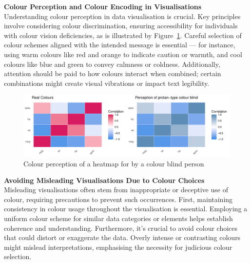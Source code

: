 \documentclass{article}\usepackage[]{graphicx}\usepackage[]{xcolor}
\makeatletter
\def\maxwidth{ %
  \ifdim\Gin@nat@width>\linewidth
    \linewidth
  \else
    \Gin@nat@width
  \fi
}
\newenvironment{knitrout}{}{} %
\numberwithin{equation}{section}
\makeatother
\begin{document}
\noindent \textbf{Colour Perception and Colour Encoding in Visualisations}\\
Understanding colour perception in data visualisation is crucial. Key principles involve considering colour discrimination, ensuring accessibility for individuals with colour vision deficiencies, as is illustrated by Figure~\ref{fig:colour-plot}. Careful selection of colour schemes aligned with the intended message is essential — for instance, using warm colours like red and orange to indicate caution or warmth, and cool colours like blue and green to convey calmness or coldness. Additionally, attention should be paid to how colours interact when combined; certain combinations might create visual vibrations or impact text legibility.\\

\begin{knitrout}\scriptsize
{}\color{fgcolor}\begin{figure}[H]

{\centering \includegraphics[width=\maxwidth]{figure/beamer-colour-plot-1} 

}

\caption[Colour perception of a heatmap for by a colour blind person]{Colour perception of a heatmap for by a colour blind person}\label{fig:colour-plot}
\end{figure}

\end{knitrout}

\noindent \textbf{Avoiding Misleading Visualisations Due to Colour Choices}\\
Misleading visualisations often stem from inappropriate or deceptive use of colour, requiring precautions to prevent such occurrences. First, maintaining consistency in colour usage throughout the visualisation is essential. Employing a uniform colour scheme for similar data categories or elements helps establish coherence and understanding. Furthermore, it's crucial to avoid colour choices that could distort or exaggerate the data. Overly intense or contrasting colours might mislead interpretations, emphasising the necessity for judicious colour selection.\\
\end{document}
